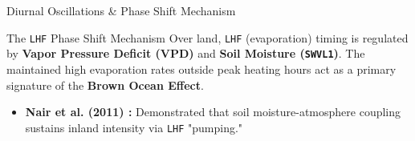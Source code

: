 \documentclass[8pt, aspectratio=169]{beamer}
\begin{document}
\begin{frame}{Diurnal Oscillations \& Phase Shift Mechanism}
    \begin{block}{The \texttt{LHF} Phase Shift Mechanism}
        Over land, \texttt{LHF} (evaporation) timing is regulated by \textbf{Vapor Pressure Deficit (VPD)} and \textbf{Soil Moisture (\texttt{SWVL1})}. The maintained high evaporation rates outside peak heating hours act as a primary signature of the \textbf{Brown Ocean Effect}. \cite{nair2011influence}
    \end{block}

    \vfill
    \noindent\makebox[\linewidth]{\rule{\paperwidth}{0.4pt}}
    \vspace{-0.2cm}
    \tiny
    \begin{itemize}
        \item \textbf{Nair et al. (2011) \cite{nair2011influence} :} Demonstrated that soil moisture-atmosphere coupling sustains inland intensity via \texttt{LHF} "pumping."
    \end{itemize}
\end{frame}

\end{document}
